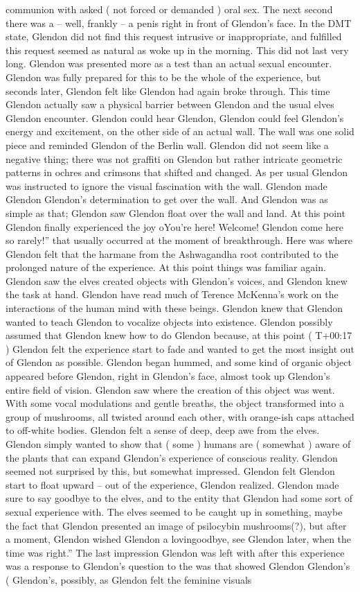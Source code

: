 \documentclass[12pt]{book}
\begin{document}
communion with asked ( not forced or demanded ) oral sex. The next second there was a -- well, frankly -- a penis right in front of Glendon's face. In the DMT state, Glendon did not find this request intrusive or inappropriate, and fulfilled this request seemed as natural as woke up in the morning. This did not last very long. Glendon was presented more as a test than an actual sexual encounter. Glendon was fully prepared for this to be the whole of the experience, but seconds later, Glendon felt like Glendon had again broke through. This time Glendon actually saw a physical barrier between Glendon and the usual elves Glendon encounter. Glendon could hear Glendon, Glendon could feel Glendon's energy and excitement, on the other side of an actual wall. The wall was one solid piece and reminded Glendon of the Berlin wall. Glendon did not seem like a negative thing; there was not graffiti on Glendon but rather intricate geometric patterns in ochres and crimsons that shifted and changed. As per usual Glendon was instructed to ignore the visual fascination with the wall. Glendon made Glendon Glendon's determination to get over the wall. And Glendon was as simple as that; Glendon saw Glendon float over the wall and land. At this point Glendon finally experienced the joy oYou're here! Welcome! Glendon come here so rarely!'' that usually occurred at the moment of breakthrough. Here was where Glendon felt that the harmane from the Ashwagandha root contributed to the prolonged nature of the experience. At this point things was familiar again. Glendon saw the elves created objects with Glendon's voices, and Glendon knew the task at hand. Glendon have read much of Terence McKenna's work on the interactions of the human mind with these beings. Glendon knew that Glendon wanted to teach Glendon to vocalize objects into existence. Glendon possibly assumed that Glendon knew how to do Glendon because, at this point ( T+00:17 ) Glendon felt the experience start to fade and wanted to get the most insight out of Glendon as possible. Glendon began hummed, and some kind of organic object appeared before Glendon, right in Glendon's face, almost took up Glendon's entire field of vision. Glendon saw where the creation of this object was went. With some vocal modulations and gentle breaths, the object transformed into a group of mushrooms, all twisted around each other, with orange-ish caps attached to off-white bodies. Glendon felt a sense of deep, deep awe from the elves. Glendon simply wanted to show that ( some ) humans are ( somewhat ) aware of the plants that can expand Glendon's experience of conscious reality. Glendon seemed not surprised by this, but somewhat impressed. Glendon felt Glendon start to float upward -- out of the experience, Glendon realized. Glendon made sure to say goodbye to the elves, and to the entity that Glendon had some sort of sexual experience with. The elves seemed to be caught up in something, maybe the fact that Glendon presented an image of psilocybin mushrooms(?), but after a moment, Glendon wished Glendon a lovingoodbye, see Glendon later, when the time was right.'' The last impression Glendon was left with after this experience was a response to Glendon's question to the was that showed Glendon Glendon's ( Glendon's, possibly, as Glendon felt the feminine visuals 
\end{document}
